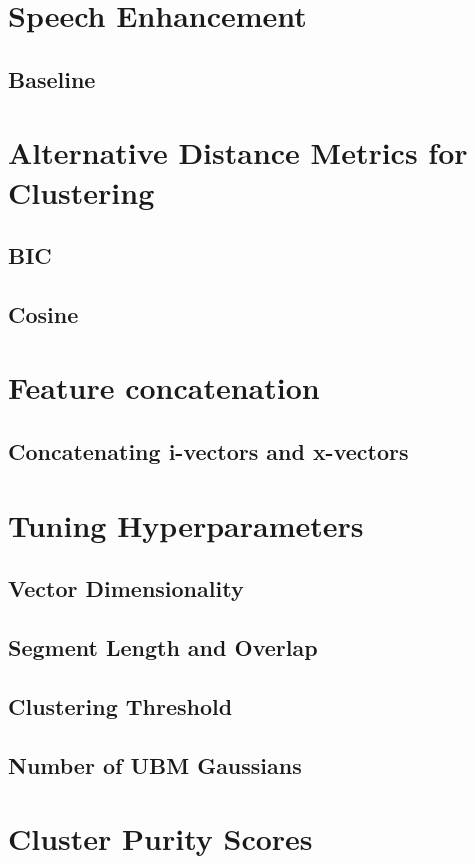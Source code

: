 	\section{Speech Enhancement}
		\subsection{Baseline}
	
	\section{Alternative Distance Metrics for Clustering}
		\subsection{BIC}
		\subsection{Cosine}
		
	\section{Feature concatenation}
		\subsection{Concatenating i-vectors and x-vectors}
	
	\section{Tuning Hyperparameters}
		\subsection{Vector Dimensionality}
		\subsection{Segment Length and Overlap}
		\subsection{Clustering Threshold}
		\subsection{Number of UBM Gaussians}
	
	\section{Cluster Purity Scores}
	
